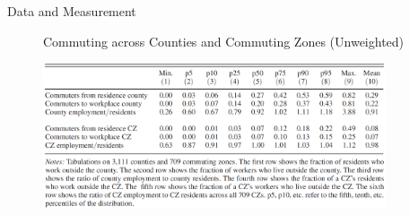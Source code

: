 \documentclass{beamer}
\begin{document}
\begin{frame}{Data and Measurement}
	\begin{figure}[htbp]
		\centering
		Commuting across Counties and Commuting Zones (Unweighted)
		\medskip

		\includegraphics[width=0.9\textwidth]{tab1.png}
	\end{figure}
\end{frame}
\end{document}
